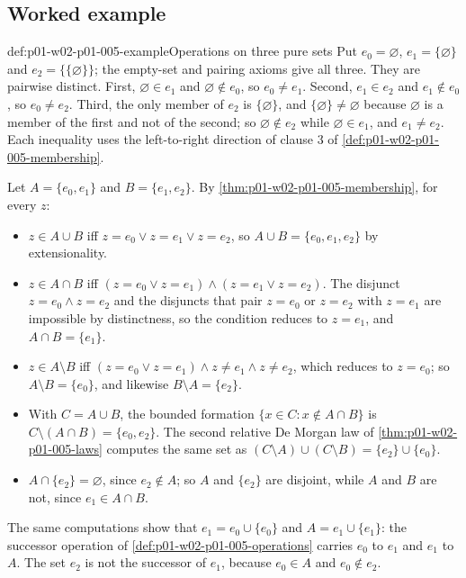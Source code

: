 \subsection{Worked example}
\label{sec:p01-w02-p01-005-example}

\begin{hbexample}{def:p01-w02-p01-005-example}{Operations on three pure sets}
Put \(e_0=\varnothing\), \(e_1=\{\varnothing\}\) and \(e_2=\{\{\varnothing\}\}\);
the empty-set and pairing axioms give all three. They are pairwise distinct.
First, \(\varnothing\in e_1\) and \(\varnothing\notin e_0\), so \(e_0\neq e_1\).
Second, \(e_1\in e_2\) and \(e_1\notin e_0\), so \(e_0\neq e_2\). Third, the
only member of \(e_2\) is \(\{\varnothing\}\), and
\(\{\varnothing\}\neq\varnothing\) because \(\varnothing\) is a member of the
first and not of the second; so \(\varnothing\notin e_2\) while
\(\varnothing\in e_1\), and \(e_1\neq e_2\). Each inequality uses the
left-to-right direction of clause 3 of
\cref{def:p01-w02-p01-005-membership}.

Let \(A=\{e_0,e_1\}\) and \(B=\{e_1,e_2\}\). By
\cref{thm:p01-w02-p01-005-membership}, for every \(z\):
\begin{itemize}
  \item \(z\in A\cup B\) iff \(z=e_0\lor z=e_1\lor z=e_2\), so
        \(A\cup B=\{e_0,e_1,e_2\}\) by extensionality.
  \item \(z\in A\cap B\) iff \((z=e_0\lor z=e_1)\land(z=e_1\lor z=e_2)\). The
        disjunct \(z=e_0\land z=e_2\) and the disjuncts that pair \(z=e_0\)
        or \(z=e_2\) with \(z=e_1\) are impossible by distinctness, so the
        condition reduces to \(z=e_1\), and \(A\cap B=\{e_1\}\).
  \item \(z\in A\setminus B\) iff \((z=e_0\lor z=e_1)\land z\neq e_1\land
        z\neq e_2\), which reduces to \(z=e_0\); so \(A\setminus B=\{e_0\}\),
        and likewise \(B\setminus A=\{e_2\}\).
  \item With \(C=A\cup B\), the bounded formation
        \(\{x\in C:x\notin A\cap B\}\) is \(C\setminus(A\cap B)=\{e_0,e_2\}\).
        The second relative De Morgan law of \cref{thm:p01-w02-p01-005-laws}
        computes the same set as
        \((C\setminus A)\cup(C\setminus B)=\{e_2\}\cup\{e_0\}\).
  \item \(A\cap\{e_2\}=\varnothing\), since \(e_2\notin A\); so \(A\) and
        \(\{e_2\}\) are disjoint, while \(A\) and \(B\) are not, since
        \(e_1\in A\cap B\).
\end{itemize}
The same computations show that \(e_1=e_0\cup\{e_0\}\) and
\(A=e_1\cup\{e_1\}\): the successor operation of
\cref{def:p01-w02-p01-005-operations} carries \(e_0\) to \(e_1\) and \(e_1\)
to \(A\). The set \(e_2\) is not the successor of \(e_1\), because
\(e_0\in A\) and \(e_0\notin e_2\).
\end{hbexample}

